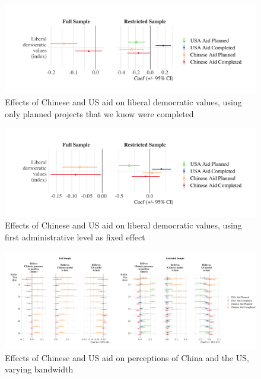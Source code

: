 \documentclass[9pt]{article}
\begin{document}
\begin{figure}[H]
\centering
\includegraphics[width=1\textwidth]{figures/figure_a8.png} %
\caption{Effects of Chinese and US aid on liberal democratic values, using only planned projects that we know were completed}
\end{figure}

\begin{figure}[H]
\centering
\includegraphics[width=1\textwidth]{figures/figure_a9.png} %
\caption{Effects of Chinese and US aid on liberal democratic values, using first administrative level as fixed effect}
\end{figure}

\begin{figure}[H]
\centering
\includegraphics[width=1\textwidth]{figures/figure_a10.png} %
\caption{Effects of Chinese and US aid on perceptions of China and the US, varying bandwidth}
\end{figure}
\end{document}
